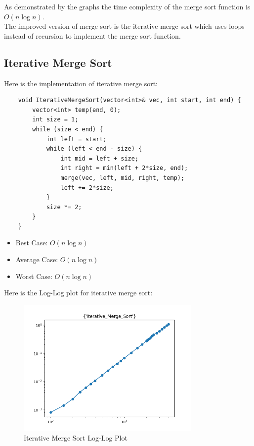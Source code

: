\documentclass{article}
\begin{document}
As demonstrated by the graphs the time complexity of the merge sort function is $O(n \log n)$. \\

The improved version of merge sort is the iterative merge sort which uses loops instead of recursion to implement the merge sort function.

\vspace{\baselineskip}
\subsection{Iterative Merge Sort}
Here is the implementation of iterative merge sort:
\begin{verbatim}
    void IterativeMergeSort(vector<int>& vec, int start, int end) {
        vector<int> temp(end, 0);
        int size = 1;
        while (size < end) {
            int left = start;
            while (left < end - size) {
                int mid = left + size;
                int right = min(left + 2*size, end);
                merge(vec, left, mid, right, temp);
                left += 2*size;
            }
            size *= 2;
        }
    }
\end{verbatim}

\begin{itemize}
    \item Best Case: $O(n \log n)$
    \item Average Case: $O(n \log n)$
    \item Worst Case: $O(n \log n)$
\end{itemize}

Here is the Log-Log plot for iterative merge sort:
\begin{figure}[H]
    \centering
    \includegraphics*[width=0.8\textwidth]{img/loglog_Iterative_Merge_Sort.png}
    \caption{Iterative Merge Sort Log-Log Plot}
\end{figure}
\end{document}
